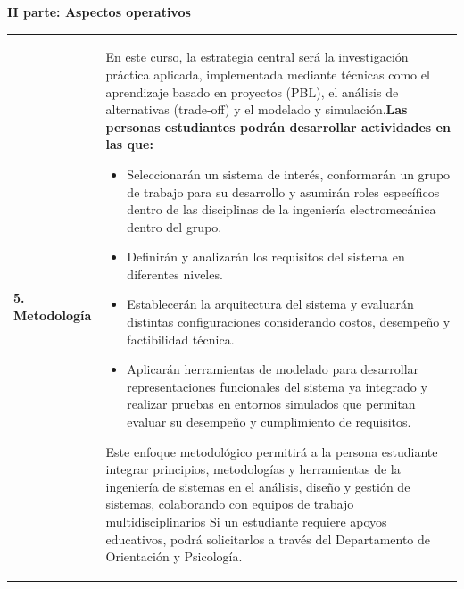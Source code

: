 \documentclass[letterpaper]{article}%
\begin{document}
\newpage%
\par\fontsize{14}{0}\selectfont \textbf{\textcolor{parte}{II parte: Aspectos operativos}}%
\vspace*{4mm}%
\newline%
\fontsize{10}{12}\selectfont %
\begin{tabularx}{\textwidth}{p{3cm}p{13cm}}%
\par\fontsize{12}{14}\selectfont \textbf{\textcolor{parte}{5. Metodología}}&En este curso, la estrategia central será la investigación práctica aplicada, implementada mediante técnicas como el aprendizaje basado en proyectos (PBL), el análisis de alternativas (trade-off) y el modelado y simulación.\newline\newline \textbf{Las personas estudiantes podrán desarrollar actividades en las que:} \newline\begin{itemize}\item Seleccionarán un sistema de interés, conformarán un grupo de trabajo para su desarrollo y asumirán roles específicos dentro de las disciplinas de la ingeniería electromecánica dentro del grupo.\item Definirán y analizarán los requisitos del sistema en diferentes niveles.\item Establecerán la arquitectura del sistema y evaluarán distintas configuraciones considerando costos, desempeño y factibilidad técnica.\item Aplicarán herramientas de modelado para desarrollar representaciones funcionales del sistema ya integrado y realizar pruebas en entornos simulados que permitan evaluar su desempeño y cumplimiento de requisitos.\end{itemize}\vspace*{2mm}Este enfoque metodológico permitirá a la persona estudiante integrar principios, metodologías y herramientas de la ingeniería de sistemas en el análisis, diseño y gestión de sistemas, colaborando con equipos de trabajo multidisciplinarios\vspace*{2mm} \newline  Si un estudiante requiere apoyos educativos, podrá solicitarlos a través del Departamento de Orientación y Psicología. \newline \\%
\end{tabularx}%
\vspace*{2mm}%
\newline%
\end{document}
